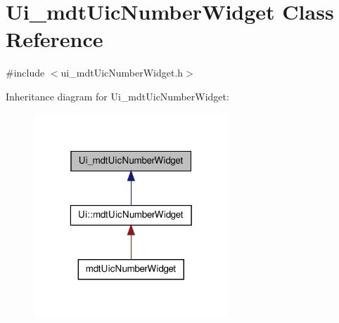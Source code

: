 \hypertarget{class_ui__mdt_uic_number_widget}{\section{Ui\-\_\-mdt\-Uic\-Number\-Widget Class Reference}
\label{class_ui__mdt_uic_number_widget}
}


{\ttfamily \#include $<$ui\-\_\-mdt\-Uic\-Number\-Widget.\-h$>$}



Inheritance diagram for Ui\-\_\-mdt\-Uic\-Number\-Widget\-:\nopagebreak
\begin{figure}[H]
\begin{center}
\leavevmode
\includegraphics[width=208pt]{class_ui__mdt_uic_number_widget__inherit__graph}
\end{center}
\end{figure}


